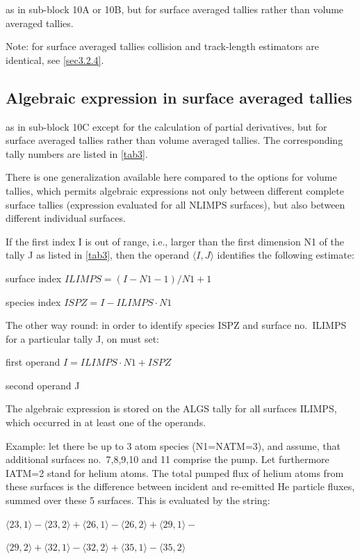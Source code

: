 as in sub-block 10A or 10B, but for surface averaged tallies rather than
volume averaged tallies.

Note: for surface averaged tallies collision and track-length estimators are
identical, see \cref{sec3.2.4}.

\subsection{Algebraic expression in surface averaged tallies}\label{sec2.10F}

as in sub-block 10C except for the calculation of partial derivatives, 
but for surface averaged tallies rather than volume averaged tallies.
The corresponding tally numbers are listed in \cref{tab3}.

There is one generalization available here compared to the options for volume
tallies, which permits algebraic expressions not only between different
complete surface tallies (expression evaluated for all NLIMPS surfaces), but
also between different individual surfaces.

If the first index I is out of range, i.e., larger than the first dimension N1
of the tally J as listed in \cref{tab3}, then the operand $\langle I,J\rangle$
identifies the following estimate:

surface index $ILIMPS = (I-N1-1)/N1 + 1 $

species index $ISPZ = I - ILIMPS \cdot N1 $

The other way round: in order to identify species ISPZ and surface no.\ ILIMPS
for a particular tally J, on must set:

first operand $I = ILIMPS \cdot N1 + ISPZ  $

second operand	J

The algebraic expression is stored on the ALGS tally for all surfaces ILIMPS,
which occurred in at least one of the operands.

Example: let there be up to 3 atom species (N1=NATM=3), and assume, that
additional surfaces no.\ 7,8,9,10 and 11 comprise the pump.
Let furthermore IATM=2 stand for helium atoms.
The total pumped flux of helium atoms from these surfaces is the difference
between incident and re-emitted He particle fluxes, summed over these 5
surfaces.
This is evaluated by the string:

$\langle 23,1\rangle-\langle 23,2\rangle+\langle 26,1\rangle-\langle
  26,2\rangle+\langle 29,1\rangle-$ 

$\langle 29,2\rangle+\langle 32,1\rangle-\langle 32,2\rangle+\langle
  35,1\rangle-\langle 35,2\rangle$ 

